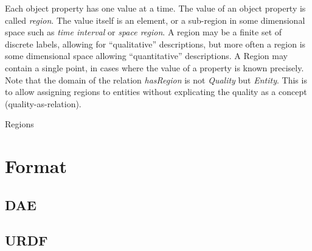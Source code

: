 Each object property has one value at a time. The value of an object property is called \emph{region}.
The value itself is an element, or a sub-region in some dimensional
space such as \emph{time interval} or \emph{space region}.
A region may be a finite set of discrete labels, allowing for ``qualitative'' descriptions,
but more often a region is some dimensional space allowing ``quantitative'' descriptions.
A Region may contain a single point, in cases where the value of a property is known precisely.
Note that the domain of the relation \emph{hasRegion} is not \emph{Quality} but \emph{Entity}.
This is to allow assigning regions to entities without explicating the quality as a concept (quality-as-relation).

\begin{ODP}{Regions}
\end{ODP}

\section{Format}
\label{sec:background:formats}
\subsection{DAE}
\subsection{URDF}

